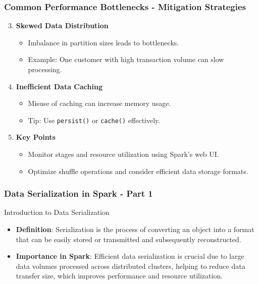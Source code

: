 \documentclass[aspectratio=169]{beamer}
\begin{document}
\begin{frame}[fragile]
    \frametitle{Common Performance Bottlenecks - Mitigation Strategies}
    
    \begin{enumerate}
        \setcounter{enumi}{2}
        \item \textbf{Skewed Data Distribution}
            \begin{itemize}
                \item Imbalance in partition sizes leads to bottlenecks.
                \item Example: One customer with high transaction volume can slow processing.
            \end{itemize}
        
        \item \textbf{Inefficient Data Caching}
            \begin{itemize}
                \item Misuse of caching can increase memory usage.
                \item Tip: Use \texttt{persist()} or \texttt{cache()} effectively.
            \end{itemize}
        
        \item \textbf{Key Points}
            \begin{itemize}
                \item Monitor stages and resource utilization using Spark's web UI.
                \item Optimize shuffle operations and consider efficient data storage formats.
            \end{itemize}
    \end{enumerate}
\end{frame}

\begin{frame}[fragile]
    \frametitle{Data Serialization in Spark - Part 1}
    \begin{block}{Introduction to Data Serialization}
        \begin{itemize}
            \item \textbf{Definition}: Serialization is the process of converting an object into a format that can be easily stored or transmitted and subsequently reconstructed.
            \item \textbf{Importance in Spark}: Efficient data serialization is crucial due to large data volumes processed across distributed clusters, helping to reduce data transfer size, which improves performance and resource utilization.
        \end{itemize}
    \end{block}
\end{frame}
\end{document}
